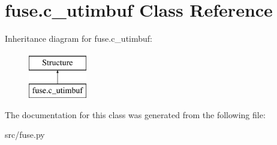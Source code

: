 \hypertarget{classfuse_1_1c__utimbuf}{\section{fuse.\-c\-\_\-utimbuf Class Reference}
\label{classfuse_1_1c__utimbuf}
}
Inheritance diagram for fuse.\-c\-\_\-utimbuf\-:\begin{figure}[H]
\begin{center}
\leavevmode
\includegraphics[height=2.000000cm]{classfuse_1_1c__utimbuf}
\end{center}
\end{figure}


The documentation for this class was generated from the following file\-:\begin{DoxyCompactItemize}
\item 
src/fuse.\-py\end{DoxyCompactItemize}
